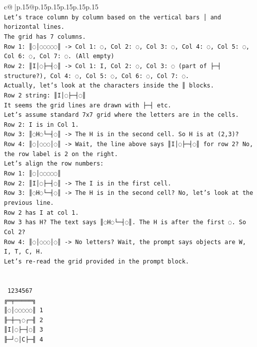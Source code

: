 \documentclass{article}
\begin{document}
{\begin{supertabular}{c@{$\;$}|p{.15\linewidth}@{}p{.15\linewidth}p{.15\linewidth}p{.15\linewidth}p{.15\linewidth}p{.15\linewidth}}
{{{\\ 
\texttt{Let's trace column by column based on the vertical bars │ and horizontal lines.} \\
\texttt{The grid has 7 columns.} \\
\texttt{Row 1: ║◌│◌◌◌◌◌║ {-}> Col 1: ◌, Col 2: ◌, Col 3: ◌, Col 4: ◌, Col 5: ◌, Col 6: ◌, Col 7: ◌. (All empty)} \\
\texttt{Row 2: ║I│◌├─┤◌║ {-}> Col 1: I, Col 2: ◌, Col 3: ◌ (part of ├─┤ structure?), Col 4: ◌, Col 5: ◌, Col 6: ◌, Col 7: ◌.} \\
\texttt{Actually, let's look at the characters inside the ║ blocks.} \\
\texttt{Row 2 string: ║I│◌├─┤◌║} \\
\texttt{It seems the grid lines are drawn with ├─┤ etc.} \\
\texttt{Let's assume standard 7x7 grid where the letters are in the cells.} \\
\texttt{Row 2: I is in Col 1.} \\
\texttt{Row 3: ║◌H◌└─┤◌║ {-}> The H is in the second cell. So H is at (2,3)?} \\
\texttt{Row 4: ║◌│◌◌◌│◌║ {-}> Wait, the line above says ║I│◌├─┤◌║ for row 2? No, the row label is 2 on the right.} \\
\texttt{Let's align the row numbers:} \\
\texttt{Row 1: ║◌│◌◌◌◌◌║} \\
\texttt{Row 2: ║I│◌├─┤◌║ {-}> The I is in the first cell.} \\
\texttt{Row 3: ║◌H◌└─┤◌║ {-}> The H is in the second cell? No, let's look at the previous line.} \\
\texttt{Row 2 has I at col 1.} \\
\texttt{Row 3 has H? The text says ║◌H◌└─┤◌║. The H is after the first ◌. So Col 2?} \\
\texttt{Row 4: ║◌│◌◌◌│◌║ {-}> No letters? Wait, the prompt says objects are W, I, T, C, H.} \\
\texttt{Let's re{-}read the grid provided in the prompt block.} \\
\\ 
\\ 
\texttt{ 1234567} \\
\texttt{╔═╤═════╗} \\
\texttt{║◌│◌◌◌◌◌║ 1} \\
\texttt{╟─┼─┐◌┌─╢ 2} \\
\texttt{║I│◌├─┤◌║ 3} \\
\texttt{╟─┘◌│C├─╢ 4} \\
}}}
\end{supertabular}}
\end{document}
